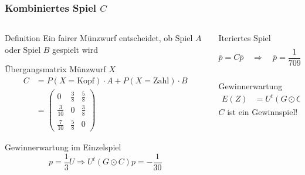 %
%
%
\bgroup
\begin{frame}[t]
\setlength{\abovedisplayskip}{5pt}
\setlength{\belowdisplayskip}{5pt}
\frametitle{Kombiniertes Spiel $C$}
\vspace{-20pt}
\begin{columns}[t,onlytextwidth]
\begin{column}{0.48\textwidth}
\begin{block}{Definition}
Ein fairer Münzwurf entscheidet, ob
Spiel $A$ oder Spiel $B$ gespielt wird
\end{block}
\begin{block}{Übergangsmatrix}
Münzwurf $X$
\begin{align*}
C
&=
P(X=\text{Kopf})\cdot A
+
P(X=\text{Zahl})\cdot B
\\
&=
\begin{pmatrix}
           0&\frac{3}{8}&\frac{5}{8}\\
\frac{3}{10}&          0&\frac{3}{8}\\
\frac{7}{10}&\frac{5}{8}&          0
\end{pmatrix}
\end{align*}
\end{block}
\begin{block}{Gewinnerwartung im Einzelspiel}
\[
p=\frac13U
\Rightarrow
U^t(G\odot C)p
=
-\frac{1}{30}
\]
\end{block}
\end{column}
\begin{column}{0.48\textwidth}
\begin{block}{Iteriertes Spiel}
\[
\overline{p}=C\overline{p}
\quad
\Rightarrow
\quad
\overline{p}=\frac{1}{709}\begin{pmatrix}245\\180\\284\end{pmatrix}
\]
\end{block}
\begin{block}{Gewinnerwartung}
\begin{align*}
E(Z)
&=
U^t (G\odot C) \overline{p}
=
\frac{18}{709}
\end{align*}
$C$ ist ein Gewinnspiel!
\end{block}
\end{column}
\end{columns}
\end{frame}
\egroup
